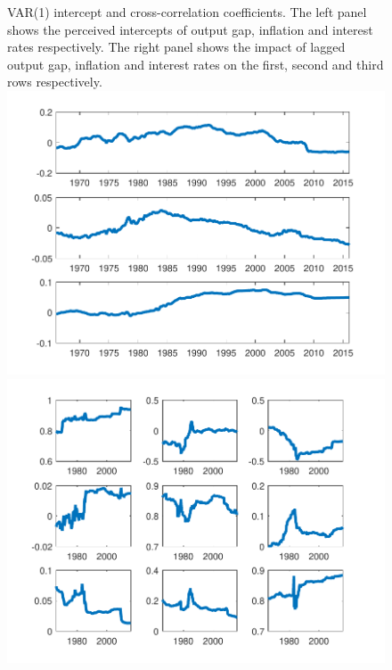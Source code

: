 \documentclass[12pt,reqno]{article}
\numberwithin{equation}{section}
\begin{document}
\begin{figure}[H]
{VAR(1) intercept and  cross-correlation coefficients. The left panel shows the perceived intercepts of output gap, inflation and interest rates respectively. The right panel shows the impact of lagged output gap, inflation and interest rates on the first, second and third rows respectively.  }\\
\includegraphics[scale=0.35]{NKPC_ree_init_VAR1_alphas.pdf}
\includegraphics[scale=0.35]{NKPC_ree_init_VAR1_betas.pdf}\\


\end{figure}
\end{document}
